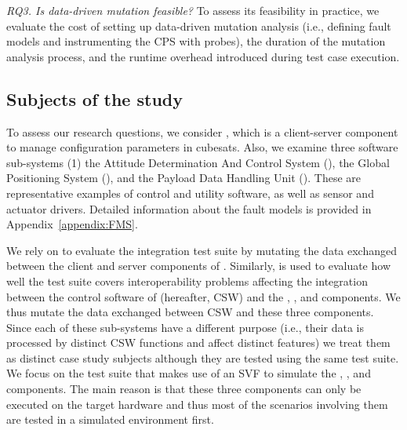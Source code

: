 \emph{RQ3.  Is data-driven mutation feasible?}
    To assess its feasibility in practice, we evaluate the cost of setting up data-driven mutation analysis (i.e., defining fault models and instrumenting the CPS with probes), {the duration of the mutation analysis process, and the} runtime overhead introduced during test case execution.    

\subsection{Subjects of the study}

%


To assess our research questions, we consider \PARAM, which is a client-server component to manage configuration parameters in cubesats.
Also, we examine three \ESAIL software sub-systems (1) the Attitude Determination And Control System (\ADCS), the Global Positioning System (\GPS), and the Payload Data Handling Unit (\PDHU). {These are representative examples of control and utility software, as well as sensor and actuator drivers.} Detailed information about the fault models is provided in Appendix~\ref{appendix:FMS}.

We rely on \APPR to evaluate the \PARAM integration test suite by  mutating the data exchanged between the client and server components of \PARAM.
Similarly, \APPR is used to evaluate how well the 
\ESAIL test suite covers interoperability problems affecting the integration between the control software of \ESAIL (hereafter, CSW) and the \ADCS, \PDHU, and \GPS components. We thus
mutate the data exchanged between \ESAIL CSW and these three components.
Since each of these sub-systems have a  different purpose (i.e., their data is processed by distinct CSW functions and affect distinct \ESAIL features) we treat them as distinct case study subjects although they are tested using the same test suite. We focus on the \ESAIL test suite that makes use of an SVF to simulate the \ADCS, \PDHU, and \GPS components. 
The main reason is that these three components can only be executed on the target hardware and thus most of the scenarios involving them are tested in a simulated environment first.


